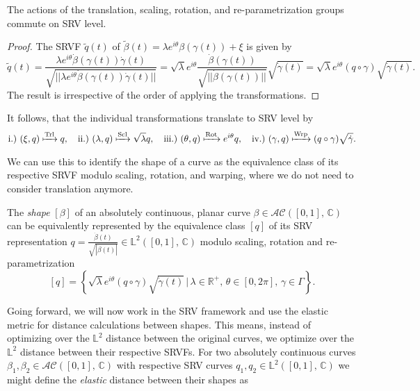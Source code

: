 \begin{lemma}
  The actions of the translation, scaling, rotation, and re-parametrization groups commute on SRV level.
\begin{proof} The SRVF $\widetilde q(t)$ of  $\widetilde\beta(t) = \lambda e^{i\theta}\beta\left(\gamma(t)\right) + \xi$ is given by
$$ \widetilde q (t) 
  = \frac{\lambda e^{i\theta} \dot\beta\left(\gamma(t)\right) \dot\gamma(t)}{\sqrt{||\lambda e^{i\theta} \dot\beta\left(\gamma(t)\right) \dot\gamma(t)||}} 
  = \sqrt{\lambda} e^{i\theta} \frac{\dot\beta\left(\gamma(t)\right)}{\sqrt{||\dot\beta\left(\gamma(t)\right)||}} \sqrt{\dot\gamma(t)} 
  = \sqrt\lambda e^{i\theta} \left( q \circ \gamma \right) \sqrt{\dot\gamma(t)}.$$
The result is irrespective of the order of applying the transformations.
\end{proof}
\end{lemma}
\begin{remark}
  It follows, that the individual transformations translate to SRV level by 
  $$\text{i.)} \,\,(\xi, q) \xmapsto{\text{Trl}} q,\quad 
    \text{ii.)} \,\, (\lambda, q) \xmapsto{\text{Scl}} \sqrt\lambda q,\quad
    \text{iii.)} \,\, (\theta, q) \xmapsto{\text{Rot}} e^{i\theta} q,\quad
    \text{iv.)} \,\, (\gamma, q) \xmapsto{\text{Wrp}} (q \circ \gamma) \sqrt{\dot\gamma}.$$
\end{remark}
\noindent We can use this to identify the shape of a curve as the equivalence class of its respective SRVF modulo scaling, rotation, and warping, where we do not need to consider translation anymore.
\begin{definition}
  The \emph{shape} $[\beta]$ of an absolutely continuous, planar curve $\beta \in \mathcal{AC}([0,1],\, \mathbb{C})$ can be equivalently represented by the equivalence class $[q]$ of its SRV representation $q = \frac{\dot\beta(t)}{\sqrt{|\dot\beta(t)|}} \in \mathbb{L}^2([0,1],\,\mathbb{C})$ modulo scaling, rotation and re-parametrization
  $$[q] = \left\{\sqrt\lambda e^{i\theta}(q \circ \gamma) \sqrt{\dot\gamma(t)} \,|\, \lambda \in \mathbb{R}^+,\, \theta \in [0,2\pi],\, \gamma
  \in \Gamma\right\}.$$
\end{definition}
\noindent Going forward, we will now work in the SRV framework and use the elastic metric for distance calculations between shapes.
This means, instead of optimizing over the $\mathbb{L}^2$ distance between the original curves, we optimize over the $\mathbb{L}^2$ distance between their respective SRVFs.
For two absolutely continuous curves $\beta_1, \beta_2 \in \mathcal{AC}([0,1],\,\mathbb{C})$ with respective SRV curves $q_1, q_2 \in \mathbb{L}^2([0,1],\,\mathbb{C})$ we might define the \textit{elastic} distance between their shapes as
